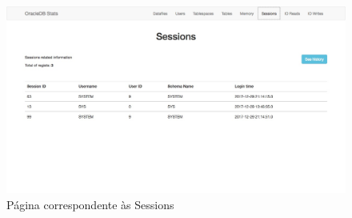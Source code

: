 \begin{figure}[h!]
 \includegraphics[width=\linewidth]{tex/img/sessions.jpg}
    \caption{Página correspondente às Sessions} 
    \label{fig:esquemarest}
\end{figure}